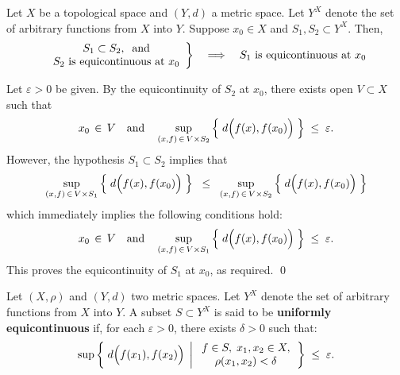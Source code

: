 \begin{proposition}
\label{SubsetPreservesEquicontinuity}
\mbox{}\vskip 0.1cm
\noindent
Let $X$ be a topological space and $(Y,d)$ a metric space.
Let $Y^{X}$ denote the set of arbitrary functions from $X$ into $Y$.
Suppose $x_{0} \in X$ and $S_{1}, S_{2} \subset Y^{X}$.
Then,
\begin{equation*}
\left.
	\begin{array}{c}
	S_{1} \subset S_{2},\;\;\textnormal{and} \\
	\textnormal{$S_{2}$ is equicontinuous at $x_{0}$}
	\end{array}
\right\}
\quad\Longrightarrow\quad
\textnormal{$S_{1}$ is equicontinuous at $x_{0}$}
\end{equation*}
\end{proposition}
\proof
Let $\varepsilon > 0$ be given.
By the equicontinuity of $S_{2}$ at $x_{0}$,
there exists open $V \subset X$ such that
\begin{equation*}
	x_{0} \,\in\, V
	\quad\textnormal{and}\quad
	\sup_{(x,f) \,\in\, V \times S_{2}}\left\{\;d\!\left(\overset{{\color{white}.}}{f}(x),f(x_{0})\right)\;\right\}
	\;\leq\; \varepsilon.
\end{equation*}
However, the hypothesis $S_{1} \subset S_{2}$ implies that
\begin{equation*}
	\sup_{(x,f) \,\in\, V \times S_{1}}\left\{\;d\!\left(\overset{{\color{white}.}}{f}(x),f(x_{0})\right)\;\right\}
	\;\;\leq\;\;
	\sup_{(x,f) \,\in\, V \times S_{2}}\left\{\;d\!\left(\overset{{\color{white}.}}{f}(x),f(x_{0})\right)\;\right\}
\end{equation*}
which immediately implies the following conditions hold:
\begin{equation*}
	x_{0} \,\in\, V
	\quad\textnormal{and}\quad
	\sup_{(x,f) \,\in\, V \times S_{1}}\left\{\;d\!\left(\overset{{\color{white}.}}{f}(x),f(x_{0})\right)\;\right\}
	\;\leq\; \varepsilon.
\end{equation*}
This proves the equicontinuity of $S_{1}$ at $x_{0}$, as required.
\qed

\begin{definition}
\mbox{}\vskip 0.1cm
\noindent
Let $(X,\rho)$ and $(Y,d)$ two metric spaces.
Let $Y^{X}$ denote the set of arbitrary functions from $X$ into $Y$.
A subset $S \subset Y^{X}$ is said to be \textbf{uniformly equicontinuous} if,
for each $\varepsilon > 0$, there exists $\delta > 0$ such that:
\begin{equation*}
\sup\left\{\;
d\!\left(\overset{{\color{white}.}}{f}(x_{1}),f(x_{2})\right)
\;\left\vert\;
\begin{array}{c} f \in S, \; x_{1},x_{2} \in X, \\ \rho(x_{1},x_{2}) < \delta \end{array}
\right.
\right\}
\;\leq\; \varepsilon.
\end{equation*}
\end{definition}


